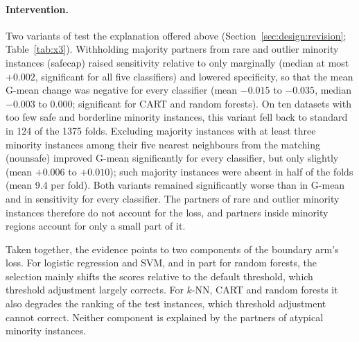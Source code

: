 \paragraph{Intervention.} Two variants of \MUSBS{} test the explanation offered above (Section~\ref{sec:design:revision}; Table~\ref{tab:x3}). Withholding majority partners from rare and outlier minority instances (safecap) raised sensitivity relative to \MUSBS{} only marginally (median at most $+0.002$, significant for all five classifiers) and lowered specificity, so that the mean G-mean change was negative for every classifier (mean $-0.015$ to $-0.035$, median $-0.003$ to $0.000$; significant for CART and random forests). On ten datasets with too few safe and borderline minority instances, this variant fell back to standard \MUSBS{} in 124 of the 1375 folds. Excluding majority instances with at least three minority instances among their five nearest neighbours from the matching (nounsafe) improved G-mean significantly for every classifier, but only slightly (mean $+0.006$ to $+0.010$); such majority instances were absent in half of the folds (mean 9.4 per fold). Both variants remained significantly worse than \RUS{} in G-mean and in sensitivity for every classifier. The partners of rare and outlier minority instances therefore do not account for the loss, and partners inside minority regions account for only a small part of it.

Taken together, the evidence points to two components of the boundary arm's loss. For logistic regression and SVM, and in part for random forests, the selection mainly shifts the scores relative to the default threshold, which threshold adjustment largely corrects. For $k$-NN, CART and random forests it also degrades the ranking of the test instances, which threshold adjustment cannot correct. Neither component is explained by the partners of atypical minority instances.






